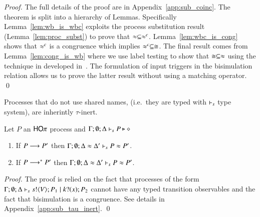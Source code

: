 \begin{proof}
	The full details of the proof are in Appendix~\ref{app:sub_coinc}.
	The theorem is split into a hierarchy of Lemmas. Specifically
	Lemma~\ref{lem:wb_is_wbc} exploits the process substitution result
	(Lemma~\ref{lem:proc_subst}) to prove that $\approx \subseteq \approx^{c}$.
	Lemma~\ref{lem:wbc_is_cong} shows that $\approx^{c}$ is a congruence
	which implies $\approx^{c} \subseteq \cong$.
	The final result comes from Lemma~\ref{lem:cong_is_wb} where
	we use label testing to show that $\cong \subseteq \approx$ using
	the technique in developed in~\cite{Hennessy07}. The formulation of input
	triggers in the bisimulation relation allows us to prove
	the latter result without using a matching operator.
	\qed
\end{proof}

Processes that do not use shared names, (i.e.~they are typed with
$\vdash_s$ type system), are inherintly $\tau$-inert.

\begin{lemma}\rm
	\label{lem:tau_inert}
	Let $P$ an $\mathsf{HO}\pi$ process
	and $\Gamma; \emptyset; \Delta \vdash_s P \triangleright \diamond$
	\begin{enumerate}
		\item	If $P \longrightarrow P'$ then $\Gamma; \emptyset; \Delta \approx \Delta' \vdash_s P \approx P'$.
		\item	If $P \longrightarrow^* P'$ then $\Gamma; \emptyset; \Delta \approx \Delta' \vdash_s P \approx P'$.
	\end{enumerate}
\end{lemma}

\begin{proof}
	The proof is relied on the fact that processes of the
	form $\Gamma; \emptyset; \Delta \vdash_s s ! \langle V \rangle ; P_1 \;|\; k ? (x) ; P_2$
	cannot have any typed transition observables and the fact
	that bisimulation is a congruence.
	See details in Appendix~\ref{app:sub_tau_inert}.
	\qed
\end{proof}



